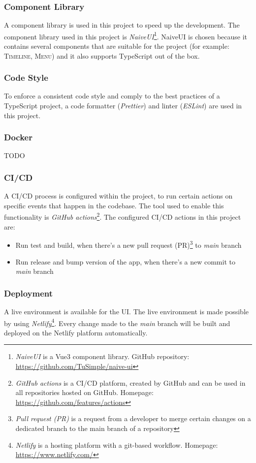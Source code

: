   \subsubsection{Component Library}
  A component library is used in this project to speed up the development. The component library used in this project is \emph{NaiveUI}\footnote{\emph{NaiveUI} is a Vue3 component library. GitHub repository: \url{https://github.com/TuSimple/naive-ui}}. NaiveUI is chosen because it contains several components that are suitable for the project (for example: \textsc{Timeline}, \textsc{Menu}) and it also supports TypeScript out of the box.

  \subsubsection{Code Style}
  To enforce a consistent code style and comply to the best practices of a TypeScript project, a code formatter (\emph{Prettier}) and linter (\emph{ESLint}) are used in this project. 

  \subsubsection{Docker}
  TODO

  \subsubsection{CI/CD}
  A CI/CD process is configured within the project, to run certain actions on specific events that happen in the codebase. The tool used to enable this functionality is \emph{GitHub actions}\footnote{\emph{GitHub actions} is a CI/CD platform, created by GitHub and can be used in all repositories hosted on GitHub. Homepage: \url{https://github.com/features/actions}}. The configured CI/CD actions in this project are:

   \begin{itemize}
    \item Run test and build, when there's a new pull request (PR)\footnote{\emph{Pull request (PR)} is a request from a developer to merge certain changes on a dedicated branch to the main branch of a repository} to \emph{main} branch
    \item Run release and bump version of the app, when there's a new commit to \emph{main} branch
   \end{itemize}
  
  \subsubsection{Deployment}
  A live environment is available for the UI. The live environment is made possible by using \emph{Netlify}\footnote{\emph{Netlify} is a hosting platform with a git-based workflow. Homepage: \url{https://www.netlify.com/}}. Every change made to the \emph{main} branch will be built and deployed on the Netlify platform automatically. 

